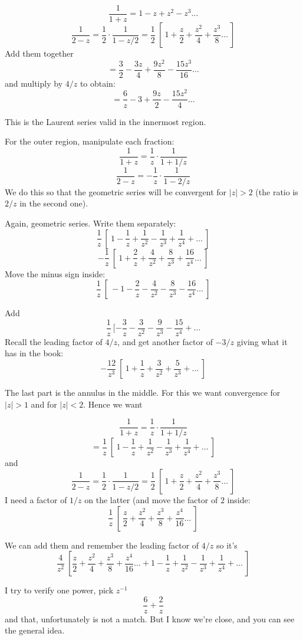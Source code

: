 \documentclass[11pt, oneside]{article}
\begin{document}
\[ \frac{1}{1 + z} = 1 - z + z^2 - z^3 \dots \]
\[ \frac{1}{2 - z} = \frac{1}{2} \cdot \frac{1}{1 - z/2} = \frac{1}{2} \ [ \ 1 + \frac{z}{2} + \frac{z^2}{4} + \frac{z^3}{8} \dots \ ] \]
Add them together 
\[ = \frac{3}{2} - \frac{3z}{4} +  \frac{9z^2}{8} - \frac{15z^3}{16} \dots \]
and multiply by $4/z$ to obtain:
\[ = \frac{6}{z} - 3 + \frac{9z}{2} - \frac{15z^2}{4} \dots \]

This is the Laurent series valid in the innermost region.

For the outer region, manipulate each fraction:
\[ \frac{1}{1 + z} = \frac{1}{z} \cdot \frac{1}{1 + 1/z} \]
\[ \frac{1}{2 - z} = -\frac{1}{z} \cdot \frac{1}{1 - 2/z} \]
We do this so that the geometric series will be convergent for $|z| > 2$ (the ratio is $2/z$ in the second one).

Again, geometric series.  Write them separately:
\[ \frac{1}{z} \ [ \ 1 - \frac{1}{z} + \frac{1}{z^2} - \frac{1}{z^3} + \frac{1}{z^4} + \dots \ ] \]
\[ -\frac{1}{z} \ [ \ 1 + \frac{2}{z} + \frac{4}{z^2} + \frac{8}{z^3} + \frac{16}{z^4} \dots \ ] \]
Move the minus sign inside:
\[ \frac{1}{z} \ [ \ -1 - \frac{2}{z} - \frac{4}{z^2} - \frac{8}{z^3} - \frac{16}{z^4} \dots \ ] \]

Add
\[ \frac{1}{z} \ [  -\frac{3}{z} - \frac{3}{z^2} - \frac{9}{z^3} - \frac{15}{z^4} + \dots \]
Recall the leading factor of $4/z$, and get another factor of $-3/z$ giving what it has in the book:
\[ -\frac{12}{z^3} \ [ \ 1 + \frac{1}{z} + \frac{3}{z^2} + \frac{5}{z^3} + \dots \ ] \]

The last part is the annulus in the middle.  For this we want convergence for $|z| > 1$ and for $|z| < 2$.  Hence we want 

\[ \frac{1}{1 + z} = \frac{1}{z} \cdot \frac{1}{1 + 1/z} \]
\[ = \frac{1}{z} \ [ \ 1  -\frac{1}{z} + \frac{1}{z^2} - \frac{1}{z^3} + \frac{1}{z^4} + \dots \ ] \]
and 
\[ \frac{1}{2 - z} = \frac{1}{2} \cdot \frac{1}{1 - z/2} = \frac{1}{2} \ [ \ 1 + \frac{z}{2} + \frac{z^2}{4} + \frac{z^3}{8} \dots \ ] \]
I need a factor of $1/z$ on the latter (and move the factor of $2$ inside:
\[ \frac{1}{z} \ [ \ \frac{z}{2} + \frac{z^2}{4} + \frac{z^3}{8} + \frac{z^4}{16} \dots \ ] \]

We can add them and remember the leading factor of $4/z$ so it's
\[ \frac{4}{z^2} \ [ \frac{z}{2} + \frac{z^2}{4} + \frac{z^3}{8} + \frac{z^4}{16} \dots + 1  -\frac{1}{z} + \frac{1}{z^2} - \frac{1}{z^3} + \frac{1}{z^4} + \dots \ ] \]

I try to verify one power, pick $z^{-1}$  
\[ \frac{6}{z} + \frac{2}{z} \]
and that, unfortunately is not a match.  But I know we're close, and you can see the general idea.
\end{document}
